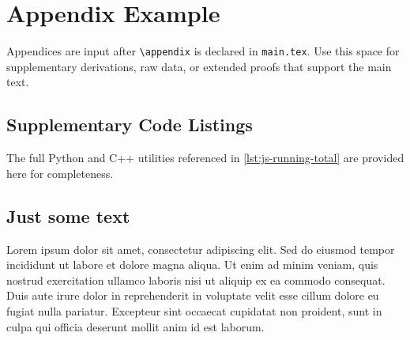 \section{Appendix Example}

Appendices are input after \texttt{\textbackslash appendix} is declared in \texttt{main.tex}. Use this space for supplementary derivations, raw data, or extended proofs that support the main text.

\subsection{Supplementary Code Listings}
\label{app:code-samples}

The full Python and C++ utilities referenced in \cref{lst:js-running-total} are provided here for completeness.





\subsection{Just some text}
Lorem ipsum dolor sit amet, consectetur adipiscing elit. Sed do eiusmod tempor incididunt ut labore et dolore magna aliqua. Ut enim ad minim veniam, quis nostrud exercitation ullamco laboris nisi ut aliquip ex ea commodo consequat. Duis aute irure dolor in reprehenderit in voluptate velit esse cillum dolore eu fugiat nulla pariatur. Excepteur sint occaecat cupidatat non proident, sunt in culpa qui officia deserunt mollit anim id est laborum.